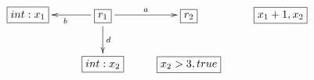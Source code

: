 $\xymatrix{
   \fbox{$int:x_1$} & \fbox{$r_1$} \ar[l]^{b} \ar[d]^{d} \ar[r]^{a} & \fbox{$r_2$} & \fbox{$x_1+1, x_2$} \\
   & \fbox{$int:x_2$} & \fbox{$x_2 > 3, true$}
}$
